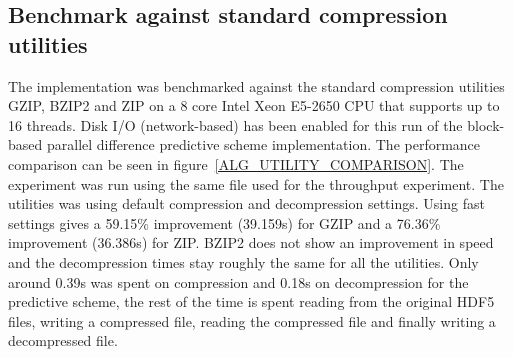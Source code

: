\subsection{Benchmark against standard compression utilities}
The implementation was benchmarked against the standard compression utilities GZIP, BZIP2 and ZIP on a 8 core Intel Xeon E5-2650 CPU that supports up to 16 threads. 
Disk I/O (network-based) has been enabled for this run of the block-based parallel difference predictive scheme implementation. The performance comparison can be seen
in figure~\ref{ALG_UTILITY_COMPARISON}. The experiment was run using the same file used for the throughput experiment. The utilities was using default compression 
and decompression settings. Using fast settings gives a 59.15\% improvement (39.159s) for GZIP and a 76.36\% improvement (36.386s) for ZIP. BZIP2 does not show an improvement 
in speed and the decompression times stay roughly the same for all the utilities.  Only around 0.39s was spent on compression and 0.18s on decompression for the predictive scheme, 
the rest of the time is spent reading from the original HDF5 files, writing a compressed file, reading the compressed file and finally writing a decompressed file.
